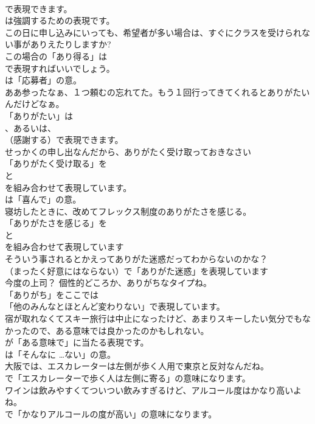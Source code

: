 \documentclass[8pt]{extreport}
\begin{document}
\begin{CJK}{UTF8}{min}
\\	で表現できます。
\\	は強調するための表現です。	
\\	この日に申し込みにいっても、希望者が多い場合は、すぐにクラスを受けられない事がありえたりしますか? 
\\	この場合の「あり得る」は 
\\	で表現すればいいでしょう。
\\	は「応募者」の意。	
\\	ああ参ったなぁ、１つ頼むの忘れてた。もう１回行ってきてくれるとありがたいんだけどなぁ。 
\\	「ありがたい」は 
\\	、あるいは、
\\	（感謝する）で表現できます。	
\\	せっかくの申し出なんだから、ありがたく受け取っておきなさい 
\\	「ありがたく受け取る」を 
\\	と 
\\	を組み合わせて表現しています。
\\	は「喜んで」の意。	
\\	寝坊したときに、改めてフレックス制度のありがたさを感じる。 
\\	「ありがたさを感じる」を 
\\	と 
\\	を組み合わせて表現しています	
\\	そういう事されるとかえってありがた迷惑だってわからないのかな？ 
\\	（まったく好意にはならない）で「ありがた迷惑」を表現しています	
\\	今度の上司？ 個性的どころか、ありがちなタイプね。 
\\	「ありがち」をここでは
\\	「他のみんなとほとんど変わりない」で表現しています。	
\\	宿が取れなくてスキー旅行は中止になったけど、あまりスキーしたい気分でもなかったので、ある意味では良かったのかもしれない。 
\\	が「ある意味で」に当たる表現です。
\\	は「そんなに …ない」の意。	
\\	大阪では、エスカレーターは左側が歩く人用で東京と反対なんだね。 
\\	で「エスカレーターで歩く人は左側に寄る」の意味になります。	
\\	ワインは飲みやすくてついつい飲みすぎるけど、アルコール度はかなり高いよね。 
\\	で「かなりアルコールの度が高い」の意味になります。

\end{CJK}
\end{document}
